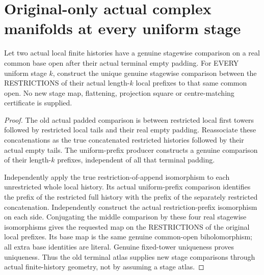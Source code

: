 \section{Original-only actual complex manifolds at every uniform stage}

\begin{theorem}
\label{hir:sharp-actual-curve-uniform-stage-local-comparison}
\leanok
Let two actual local finite histories have a genuine stagewise comparison
on a real common base open after their actual terminal empty padding.
For EVERY uniform stage $k$, construct the unique genuine stagewise
comparison between the RESTRICTIONS of their actual length-$k$ local
prefixes to that same common open. No new stage map, flattening,
projection square or centre-matching certificate is supplied.
\end{theorem}
\begin{proof}
The old actual padded comparison is between restricted local first
towers followed by restricted local tails and their real empty padding.
Reassociate these concatenations as the true concatenated restricted
histories followed by their actual empty tails. The uniform-prefix
producer constructs a genuine comparison of their length-$k$ prefixes,
independent of all that terminal padding.

Independently apply the true restriction-of-append isomorphism to each
unrestricted whole local history. Its actual uniform-prefix comparison
identifies the prefix of the restricted full history with the prefix
of the separately restricted concatenation. Independently construct
the actual restriction-prefix isomorphism on each side. Conjugating
the middle comparison by these four real stagewise isomorphisms gives
the requested map on the RESTRICTIONS of the original local prefixes.
Its base map is the same genuine common-open biholomorphism; all extra
base identities are literal. Genuine fixed-tower uniqueness proves
uniqueness. Thus the old terminal atlas supplies new stage comparisons
through actual finite-history geometry, not by assuming a stage atlas.
\end{proof}

